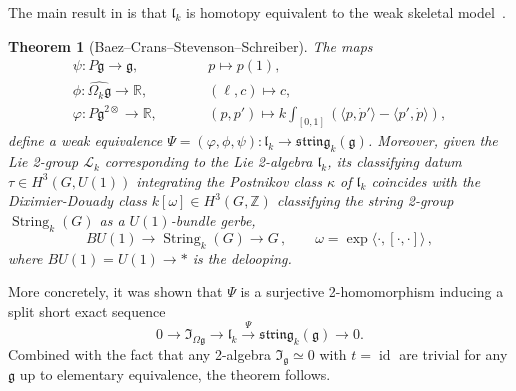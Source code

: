 \documentclass[onecolumn]{article}
\theoremstyle{theorem}
\newtheorem{theorem}{Theorem}[section]
\theoremstyle{remark}
\theoremstyle{example}
\theoremstyle{definition}
\numberwithin{equation}{section}
\def\g{\mathfrak g}
\def\bbZ{\mathbb{Z}}
\begin{document}

The main result in  \cite{Baez:2005sn} is that $\mathfrak{l}_k$ is homotopy equivalent to the weak skeletal model~\cite{Kim:2019owc}.
\begin{theorem}[Baez--Crans--Stevenson--Schreiber]\label{thm:bcss}
 The maps
\begin{eqnarray}
    \psi:P\mathfrak{g} \rightarrow \mathfrak{g},&\qquad& p \mapsto p(1),\nonumber \\
    \phi: \widehat{\Omega_k\mathfrak{g}} \rightarrow \mathbb{R}, &\qquad& (\ell,c)\mapsto c,\nonumber \\
    \varphi: P\mathfrak{g}^{2\otimes}\rightarrow\mathbb{R}, &\qquad& (p,p')\mapsto k\int_{[0,1]}(\langle p,\dot p'\rangle - \langle p',\dot p\rangle),\nonumber
\end{eqnarray}
define a weak equivalence $\Psi=(\varphi,\phi,\psi):\mathfrak{l}_k\rightarrow\mathfrak{string}_k(\mathfrak{g})$. Moreover, given the Lie 2-group $\mathcal{L}_k$ corresponding to the Lie 2-algebra $\mathfrak{l}_k$, its classifying datum $\tau\in  H^3(G,U(1))$ integrating the Postnikov class $\kappa$ of $\mathfrak{l}_k$ coincides with the Diximier-Douady class $k[\omega]\in H^3(G,\bbZ)$ classifying the string 2-group $\operatorname{String}_k(G)$ as a $U(1)$-bundle gerbe,
\begin{equation*}
    BU(1)\to \operatorname{String}_k(G)\to G\,, \qquad \omega = \exp \langle\cdot,[\cdot,\cdot]\rangle\,,
\end{equation*}
where $BU(1)=U(1)\to \ast$ is the delooping.
\end{theorem}

{More} %
 concretely, it was shown that $\Psi$ is a surjective 2-homomorphism inducing a { {split}} short exact sequence
    \begin{equation}
        0\rightarrow \mathfrak{I}_{\Omega\mathfrak{g}}\rightarrow \mathfrak{l}_k \xrightarrow{\Psi} \mathfrak{string}_k(\mathfrak{g})\rightarrow 0.\label{eq:shortloop}
    \end{equation}
{Combined} with the fact that any 2-algebra $\mathfrak{I}_\mathfrak{g}\simeq 0$ with $t=\operatorname{id}$ are trivial for any $\mathfrak{g}$ up to elementary equivalence, the theorem follows.
\end{document}
